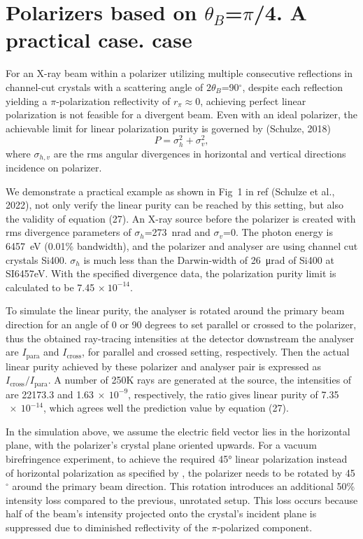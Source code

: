 \documentclass{iucr}
\begin{document}
\section{Polarizers based on $\theta_B$=$\pi$/4. A practical case. case}\label{sec:polarizers45degPractical}

For an X-ray beam within a polarizer utilizing multiple consecutive reflections in channel-cut crystals with a scattering angle of $2\theta_B$=90$^\circ$, despite each reflection yielding a $\pi$-polarization reflectivity of $r_\pi\approx 0$, achieving perfect linear polarization is not feasible for a divergent beam.
Even with an ideal polarizer, the achievable limit for linear polarization purity is governed by (Schulze, 2018)
\begin{equation}\label{eq:polarizer}
    P = \sigma_h^2 + \sigma_v^2,
\end{equation}
where $\sigma_{h,v}$ are the rms angular divergences in horizontal and vertical directions incidence on polarizer.

We demonstrate a practical example as shown in Fig~1 in ref (Schulze et al., 2022), not only verify the linear purity can be reached by this setting, but also the validity of equation (27).
An X-ray source before the polarizer is created with rms divergence parameters of $\sigma_h$=273~nrad and $\sigma_v$=0.
The photon energy is \SI{6457}{eV} (0.01\% bandwidth), and the polarizer and analyser are using channel cut crystals Si400.
$\sigma_h$ is much less than the Darwin-width of \SI{26}{\micro\radian} of Si400 at SI{6457}{eV}.
With the specified divergence data, the polarization purity limit is calculated to be 7.45 $\times~10^{-14}$.

To simulate the linear purity, the analyser is rotated around the primary beam direction for an angle of 0 or 90 degrees to set parallel or crossed to the polarizer, thus the obtained ray-tracing intensities at the detector downstream the analyser are $I_\text{para}$ and $I_\text{cross}$, for parallel and crossed setting, respectively.
Then the actual linear purity achieved by these polarizer and analyser pair is expressed as $I_\text{cross}/I_\text{para}$.
A number of 250K rays are generated at the source, the intensities of  are 22173.3 and 1.63$~\times~10^{-9}$, respectively, the ratio gives linear purity of 7.35$~\times~10^{-14}$, which agrees well the prediction value by equation (27).

In the simulation above, we assume the electric field vector lies in the horizontal plane, with the polarizer’s crystal plane oriented upwards.
For a vacuum birefringence experiment, to achieve the required 45° linear polarization instead of horizontal polarization as specified by \cite{Shen2018}, the polarizer needs to be rotated by 45$^\circ$ around the primary beam direction.
This rotation introduces an additional 50\% intensity loss compared to the previous, unrotated setup.
This loss occurs because half of the beam’s intensity projected onto the crystal’s incident plane is suppressed due to diminished reflectivity of the $\pi$-polarized component.
\end{document}
